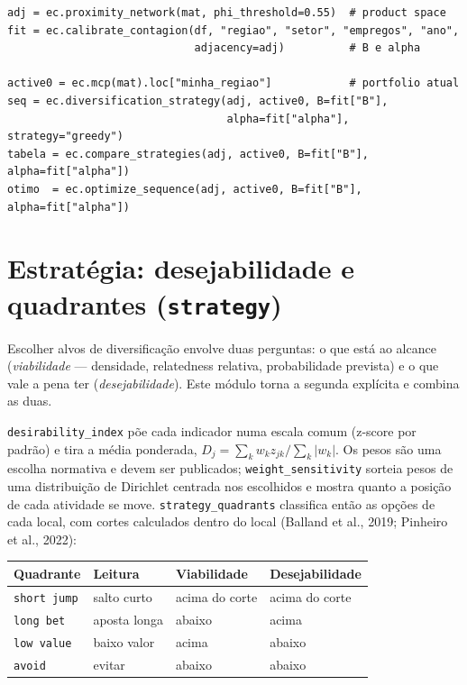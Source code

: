 \documentclass[12pt, a4paper]{article}
\newcommand{\fn}[1]{\texttt{#1}}
\begin{document}
\begin{lstlisting}[caption={Fluxo de difus\~{a}o estrat\'{e}gica}]
adj = ec.proximity_network(mat, phi_threshold=0.55)  # product space
fit = ec.calibrate_contagion(df, "regiao", "setor", "empregos", "ano",
                             adjacency=adj)          # B e alpha

active0 = ec.mcp(mat).loc["minha_regiao"]            # portfolio atual
seq = ec.diversification_strategy(adj, active0, B=fit["B"],
                                  alpha=fit["alpha"], strategy="greedy")
tabela = ec.compare_strategies(adj, active0, B=fit["B"], alpha=fit["alpha"])
otimo  = ec.optimize_sequence(adj, active0, B=fit["B"], alpha=fit["alpha"])
\end{lstlisting}

\section{Estrat\'{e}gia: desejabilidade e quadrantes (\texttt{strategy})}

Escolher alvos de diversifica\c{c}\~{a}o envolve duas perguntas: o que
est\'{a} ao alcance (\emph{viabilidade} --- densidade, relatedness
relativa, probabilidade prevista) e o que vale a pena ter
(\emph{desejabilidade}). Este m\'{o}dulo torna a segunda expl\'{i}cita e
combina as duas.

\fn{desirability\_index} p\~{o}e cada indicador numa escala comum
(z-score por padr\~{a}o) e tira a m\'{e}dia ponderada,
$D_j = \sum_k w_k z_{jk} / \sum_k |w_k|$. Os pesos s\~{a}o uma escolha
normativa e devem ser publicados; \fn{weight\_sensitivity} sorteia pesos
de uma distribui\c{c}\~{a}o de Dirichlet centrada nos escolhidos e mostra
quanto a posi\c{c}\~{a}o de cada atividade se move.
\fn{strategy\_quadrants} classifica ent\~{a}o as op\c{c}\~{o}es de cada
local, com cortes calculados dentro do local (Balland et al., 2019;
Pinheiro et al., 2022):

\begin{center}
\small
\begin{tabular}{llll}
\toprule
\textbf{Quadrante} & \textbf{Leitura} & \textbf{Viabilidade} & \textbf{Desejabilidade} \\
\midrule
\texttt{short jump} & salto curto  & acima do corte & acima do corte \\
\texttt{long bet}   & aposta longa & abaixo         & acima \\
\texttt{low value}  & baixo valor  & acima          & abaixo \\
\texttt{avoid}      & evitar       & abaixo         & abaixo \\
\bottomrule
\end{tabular}
\end{center}
\end{document}

